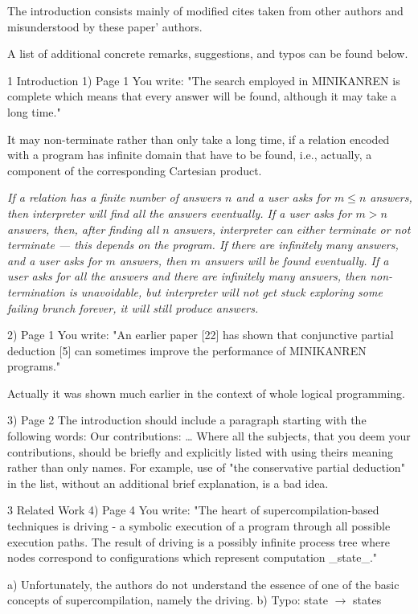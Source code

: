 The introduction consists mainly of modified cites taken from other authors and misunderstood by these paper' authors.

A list of additional concrete remarks, suggestions, and typos can be found below.


1 Introduction
1) Page 1
You write: "The search employed in MINIKANREN is complete which means that every answer will be found, although it may take a long time."

It may non-terminate rather than only take a long time, if a relation encoded with a program has infinite domain that have to be found, i.e., actually, a component of the corresponding Cartesian product.

\emph{If a \mk relation has a finite number of answers $n$ and a user asks for $m \leq n$ answers, then \mk interpreter will find all the answers eventually. If a user asks for $m > n$ answers, then, after finding all $n$ answers, \mk interpreter can either terminate or not terminate --- this depends on the \mk program. If there are infinitely many answers, and a user asks for $m$ answers, then $m$ answers will be found eventually. If a user asks for all the answers and there are infinitely many answers, then non-termination is unavoidable, but \mk interpreter will not get stuck exploring some failing brunch forever, it will still produce answers.}

2) Page 1
You write: "An earlier paper [22] has shown that conjunctive partial deduction [5] can sometimes improve the performance of MINIKANREN programs."

Actually it was shown much earlier in the context of whole logical programming.

3) Page 2
The introduction should include a paragraph starting with the following words: Our contributions: …
Where all the subjects, that you deem your contributions, should be briefly and explicitly listed with using theirs meaning rather than only names.
For example, use of  "the conservative partial deduction" in the list, without an additional brief explanation, is a bad idea.


3 Related Work
4) Page 4
You write: "The heart of supercompilation-based techniques is driving - a symbolic execution of a program through all possible execution paths. The result of driving is a possibly infinite process tree where nodes correspond to configurations which represent computation _state_."

    a) Unfortunately, the authors do not understand the essence of one of the basic concepts of supercompilation, namely the driving.
    b) Typo:  state $\rightarrow$ states

